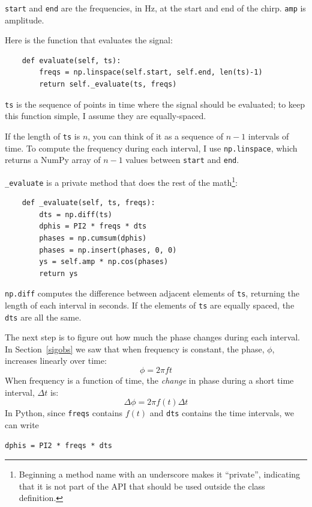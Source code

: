 \documentclass[12pt]{book}
\begin{document}
{\tt start} and {\tt end} are the frequencies, in Hz, at the start
and end of the chirp.  {\tt amp} is amplitude.

Here is the function that evaluates the signal:

\begin{verbatim}
    def evaluate(self, ts):
        freqs = np.linspace(self.start, self.end, len(ts)-1)
        return self._evaluate(ts, freqs)
\end{verbatim}

{\tt ts} is the sequence of points in time where the signal should be
evaluated; to keep this function simple, I assume they are equally-spaced.

If the length of {\tt ts} is $n$, you can think of it as a sequence of
$n-1$ intervals of time.  To compute the frequency during each
interval, I use {\tt np.linspace}, which returns a NumPy array of
$n-1$ values between {\tt start} and {\tt end}.

\verb"_evaluate" is a private method
that does the rest of the math\footnote{Beginning a method name
  with an underscore makes it ``private'', indicating that it is not
  part of the API that should be used outside the class definition.}:

\begin{verbatim}
    def _evaluate(self, ts, freqs):
        dts = np.diff(ts)
        dphis = PI2 * freqs * dts
        phases = np.cumsum(dphis)
        phases = np.insert(phases, 0, 0)
        ys = self.amp * np.cos(phases)
        return ys
\end{verbatim}

{\tt np.diff} computes the difference between adjacent elements
of {\tt ts}, returning the length of each interval in seconds.  
If the elements of {\tt ts} are equally spaced,
the {\tt dts} are all the same.

The next step is to figure out how much the phase changes during
each interval.  In Section~\ref{sigobs} we saw that when frequency is
constant, the phase, $\phi$, increases linearly over time:
%
\[ \phi = 2 \pi f t \]
%
When frequency is a function of time, the {\em change} in phase
during a short time interval, $\Delta t$ is:
%
\[ \Delta \phi = 2 \pi f(t) \Delta t \]
%
In Python, since {\tt freqs} contains $f(t)$ and {\tt dts}
contains the time intervals, we can write

\begin{verbatim}
dphis = PI2 * freqs * dts
\end{verbatim}
\end{document}
